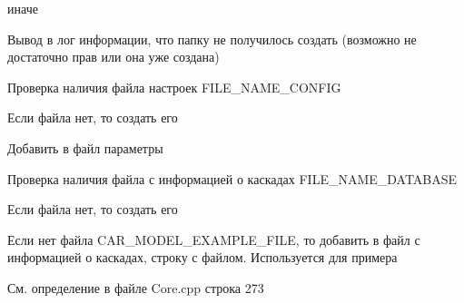 иначе \begin{DoxyVerb}Вывод в лог информации, что папку не получилось создать (возможно не достаточно прав или она уже создана)
\end{DoxyVerb}


Проверка наличия файла настроек F\+I\+L\+E\+\_\+\+N\+A\+M\+E\+\_\+\+C\+O\+N\+F\+IG

Если файла нет, то создать его \begin{DoxyVerb}Добавить в файл параметры
\end{DoxyVerb}


Проверка наличия файла с информацией о каскадах F\+I\+L\+E\+\_\+\+N\+A\+M\+E\+\_\+\+D\+A\+T\+A\+B\+A\+SE

Если файла нет, то создать его

Если нет файла C\+A\+R\+\_\+\+M\+O\+D\+E\+L\+\_\+\+E\+X\+A\+M\+P\+L\+E\+\_\+\+F\+I\+LE, то добавить в файл с информацией о каскадах, строку с файлом. Используется для примера 

См. определение в файле Core.\+cpp строка 273

